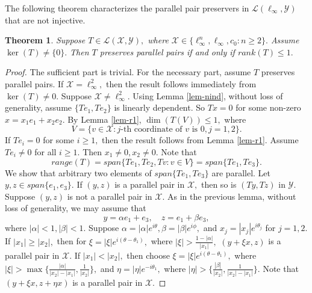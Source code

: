 \documentclass{amsart}
\newtheorem{theorem}{Theorem}[section]
\theoremstyle{definition}
\theoremstyle{remark}
\numberwithin{equation}{section}
\begin{document}
The following theorem characterizes the parallel pair preservers in $\mathcal{L}(\ell_\infty,\mathcal{Y})$ that are not injective.
\begin{theorem}\label{th-ncom}
	Suppose $T\in \mathcal{L}(\mathcal{X},\mathcal{Y}),$  where  $\mathcal{X}\in\{\ell_\infty^n,\ell_\infty,c_0:n\geq 2\}.$ Assume $\ker(T)\neq \{0\}.$ Then $T$ preserves parallel pairs  if and only if $rank(T)\leq 1.$
\end{theorem}
\begin{proof}
	The sufficient part is trivial. For the necessary part, assume $T$ preserves parallel pairs. 
	If $\mathcal{X}=\ell_\infty^2,$ then the result follows immediately from $\ker(T)\neq 0.$ Suppose $\mathcal{X}\neq \ell_\infty^2.$ 	Using Lemma \ref{lem-nind}, without loss of generality, assume $\{Te_1,Te_2\}$ is linearly dependent. So $Tx=0$ for some non-zero $x=x_1e_1+x_2e_2.$ By Lemma \ref{lem-r1}, $\dim(T(V))\leq 1,$ where
	$$V=\{v\in \mathcal{X}:j\text{-th coordinate of } v \text{ is }0, j=1,2\}.$$
	If  $Te_i=0$ for some $i\geq 1,$ then the result follows from Lemma \ref{lem-r1}. Assume  $Te_i\neq 0$ for all $i\geq 1.$ Then $x_1\neq 0,x_2\neq 0.$
	Note that $$range(T)=span\{Te_1,Te_2, Tv:v\in V\} =span\{Te_1,Te_3\}.$$ 
We show that arbitrary two elements of $span \{Te_1,Te_3\}$ are parallel. Let $y,z\in span\{e_1,e_3\}.$ If $(y,z)$ is a parallel pair in $\mathcal{X},$ then so is $(Ty,Tz)$ in $\mathcal{Y}.$ Suppose $(y,z)$ is not a parallel pair in $\mathcal{X}.$ As in the previous lemma, without loss of generality, we may assume that 
	\[y=\alpha e_1+e_3, \quad z=e_1+\beta e_3,\]
	where $|\alpha|<1,|\beta|<1.$ Suppose $\alpha=|\alpha|e^{i\theta},\beta=|\beta|e^{i\phi},$ and $x_j=|x_j|e^{i\theta_j}$ for $j=1,2.$\\ %
	If $|x_1|\geq |x_2|,$ then for $\xi=|\xi|e^{i(\theta-\theta_1)},$ where $|\xi|>\frac{1-|\alpha|}{|x_1|},$  $(y+\xi x,z)$ is a parallel pair in $\mathcal{X}.$
	If $|x_1|< |x_2|,$ then choose $\xi=|\xi|e^{i(\theta-\theta_1)},$ where $|\xi|>\max\Big\{\frac{|\alpha|}{|x_2|-|x_1|}, \frac{1}{|x_2|}\Big\},$ and $\eta=|\eta|e^{-i\theta_1},$ where $|\eta|>\Big\{\frac{|\beta|}{|x_2|},\frac{1}{|x_2|-|x_1|}\Big\}.$ Note that  $(y+\xi x,z+\eta x)$ is a parallel pair in $\mathcal{X}.$

\end{proof}
\end{document}
